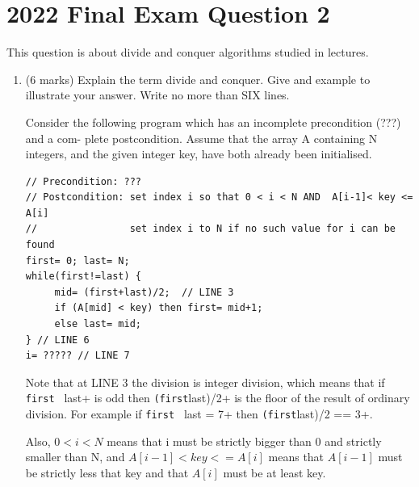 \documentclass[twoside=false,DIV=14]{scrartcl}
\begin{document}
 

\section{2022 Final Exam Question 2}
This question is about divide and conquer algorithms studied in lectures.

\begin{enumerate}
\item (6 marks) Explain the term divide and conquer. Give and example to illustrate your
answer. Write no more than SIX lines.


Consider the following program which has an incomplete precondition (???) and a com- plete postcondition. Assume that the array A containing N integers, and the given integer key, have both already been initialised.
{\small\begin{lstlisting}
// Precondition: ???
// Postcondition: set index i so that 0 < i < N AND  A[i-1]< key <= A[i]
//                set index i to N if no such value for i can be found
first= 0; last= N;
while(first!=last) {
     mid= (first+last)/2;  // LINE 3
     if (A[mid] < key) then first= mid+1;
     else last= mid;
} // LINE 6
i= ????? // LINE 7
\end{lstlisting}}
Note that at LINE 3 the division is integer division, which means that if \verb+first + last+ is odd then \verb+(first+last)/2+ is the floor of the result of ordinary division. For example if \verb+first + last = 7+ then \verb+(first+last)/2 == 3+.

Also, $0 < i < N$ means that i must be strictly bigger than 0 and strictly smaller than N, and $A[i-1]< key <= A[i]$ means that $A[i-1]$ must be strictly less that key and that $A[i]$ must be at least key.


\end{enumerate}
\end{document}
